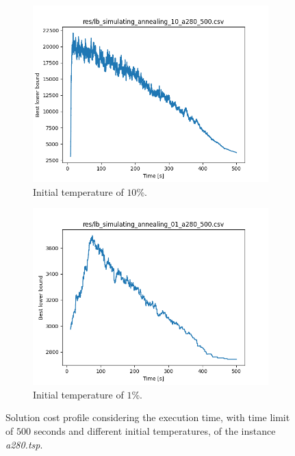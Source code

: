 \begin{figure}[!h]
\begin{subfigure}{.5\columnwidth}
		\centering
		\includegraphics[width=\columnwidth]{../res/lb_simulating_annealing_10_a280_500.png}
		\caption{Initial temperature of $10$\%.}
		\label{fig:sim_ann_10}
	\end{subfigure}
	\begin{subfigure}{.5\columnwidth}
		\centering
		\includegraphics[width=\columnwidth]{../res/lb_simulating_annealing_01_a280_500.png}
		\caption{Initial temperature of $1$\%.}
		\label{fig:sim_ann_1}
	\end{subfigure}
	\caption{Solution cost profile considering the execution time, with time limit of $500$ seconds and different initial temperatures, of the instance \textit{a280.tsp}.}
	\label{fig:sim_ann_temperature}
\end{figure}
